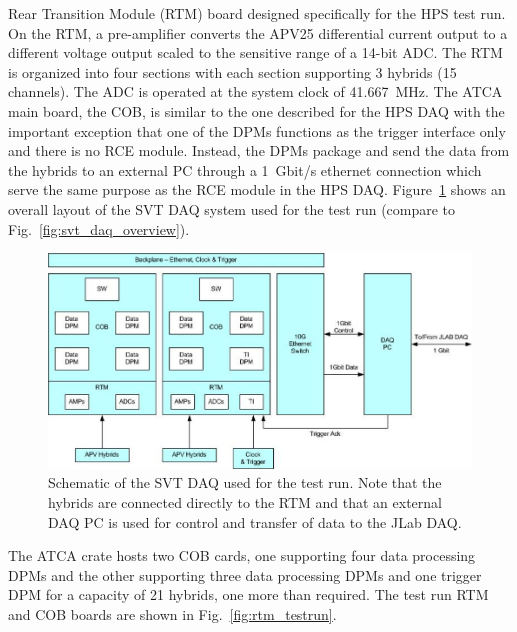 Rear Transition Module (RTM) board designed specifically for the HPS test run. 
On the RTM, a pre-amplifier converts the APV25 differential current output to a different voltage output 
scaled to the sensitive range of a 14-bit ADC. The RTM is organized into four sections with each section 
supporting 3 hybrids (15 channels). The ADC is operated at the system clock of 41.667~MHz. 
The ATCA main board, the COB, is similar to the one described for the HPS DAQ 
with the important exception that one of the DPMs functions as the trigger 
interface only and there is no RCE module. Instead, the DPMs package and send the data from the hybrids to 
an external PC through a 1~Gbit/s ethernet connection which serve the same purpose as the 
RCE module in the HPS DAQ. Figure~\ref{fig:svtdaq} shows an overall layout of 
the SVT DAQ system used for the test run (compare to Fig.~\ref{fig:svt_daq_overview}).
 \begin{figure}[t]
\includegraphics[scale=0.9]{test2012/daq/svt_daq_diagram.png}
\caption{\small{Schematic of the SVT DAQ used for the test run. Note that the hybrids are connected directly 
to the RTM and that an external DAQ PC is used for control and transfer of data to the JLab DAQ.}}
\label{fig:svtdaq}
\end{figure}
The ATCA crate hosts two COB cards, one supporting four data processing DPMs and the other supporting three data processing DPMs and one trigger DPM for a capacity of 21 hybrids, one more than required. 
The test run RTM and COB boards are shown in Fig.~\ref{fig:rtm_testrun}. 
